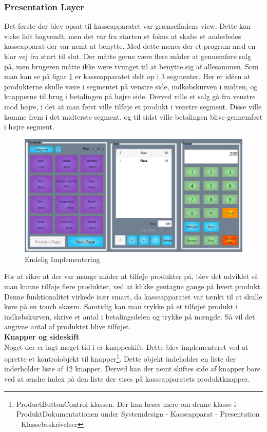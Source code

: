 \subsubsection{Presentation Layer}

Det første der blev opsat til kasseapparatet var grænsefladens view. Dette kan virke lidt bagvendt, men det var fra starten et fokus at skabe et anderledes kasseapparat der var nemt at benytte. Med dette menes der et program med en klar vej fra start til slut. Der måtte gerne være flere måder at gennemføre salg på, men brugeren måtte ikke være tvunget til at benytte sig af allesammen.
Som man kan se på figur \ref{fig:sub2} er kasseapparatet delt op i 3 segmenter. Her er idéen at produkterne skulle være i segmentet på venstre side, indkøbskurven i midten, og knapperne til brug i betalingen på højre side. Derved ville et salg gå fra venstre mod højre, i det at man først ville tilføje et produkt i venstre segment. Disse ville komme frem i det midterste segment, og til sidst ville betalingen blive gennemført i højre segment. 

\begin{figure}[H]
	\centering
	\includegraphics[width=0.9\linewidth]{Projektbeskrivelse/DesignOgImplementering/pics/GUI}
	\caption{Endelig Implementering}
	\label{fig:sub2}
\end{figure}

For at sikre at der var mange måder at tilføje produkter på, blev det udviklet så man kunne tilføje flere produkter, ved at klikke gentagne gange på hvert produkt. Denne funktionalitet virkede især smart, da kasseapparatet var tænkt til at skulle køre på en touch skærm. Samtidig kan man trykke på et tilføjet produkt i indkøbskurven, skrive et antal i betalingsdelen og trykke på mængde. Så vil det angivne antal af produktet blive tilføjet.\\

\textbf{Knapper og sideskift} \\
Noget der er lagt meget tid i er knappeskift. Dette blev implementeret ved at oprette et kontrolobjekt til knapper\footnote{ProductButtonControl klassen. Der kan læses mere om denne klasse i ProduktDokumentationen under Systemdesign - Kasseapparat - Presentation - Klassebeskrivelser}. Dette objekt indeholder en liste der inderholder liste af 12 knapper. Derved kan der nemt skiftes side af knapper bare ved at ændre index på den liste der vises på kasseapparatets produktknapper.